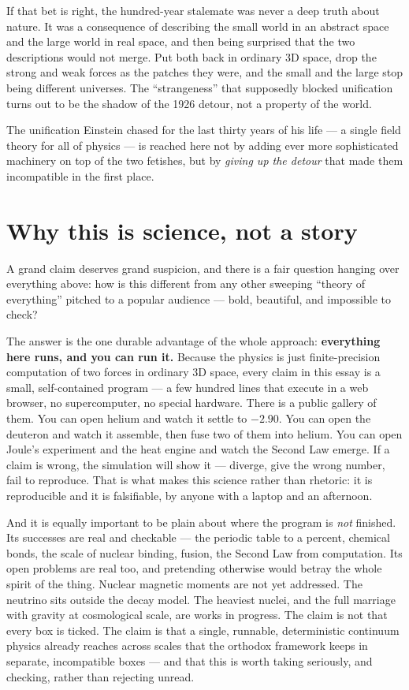\documentclass[11pt]{article}
\begin{document}
If that bet is right, the hundred-year stalemate was never a deep truth about nature. It was a
consequence of describing the small world in an abstract space and the large world in real space,
and then being surprised that the two descriptions would not merge. Put both back in ordinary 3D
space, drop the strong and weak forces as the patches they were, and the small and the large stop
being different universes. The ``strangeness'' that supposedly blocked unification turns out to be
the shadow of the 1926 detour, not a property of the world.

The unification Einstein chased for the last thirty years of his life --- a single field theory for
all of physics --- is reached here not by adding ever more sophisticated machinery on top of the
two fetishes, but by \emph{giving up the detour} that made them incompatible in the first place.

\section*{Why this is science, not a story}

A grand claim deserves grand suspicion, and there is a fair question hanging over everything above:
how is this different from any other sweeping ``theory of everything'' pitched to a popular audience
--- bold, beautiful, and impossible to check?

The answer is the one durable advantage of the whole approach: \textbf{everything here runs, and
you can run it.} Because the physics is just finite-precision computation of two forces in ordinary
3D space, every claim in this essay is a small, self-contained program --- a few hundred lines that
execute in a web browser, no supercomputer, no special hardware. There is a public gallery of them.
You can open helium and watch it settle to $-2.90$. You can open the deuteron and watch it assemble,
then fuse two of them into helium. You can open Joule's experiment and the heat engine and watch
the Second Law emerge. If a claim is wrong, the simulation will show it --- diverge, give the wrong
number, fail to reproduce. That is what makes this science rather than rhetoric: it is reproducible
and it is falsifiable, by anyone with a laptop and an afternoon.

And it is equally important to be plain about where the program is \emph{not} finished. Its
successes are real and checkable --- the periodic table to a percent, chemical bonds, the scale of
nuclear binding, fusion, the Second Law from computation. Its open problems are real too, and
pretending otherwise would betray the whole spirit of the thing. Nuclear magnetic moments are not
yet addressed. The neutrino sits outside the decay model. The heaviest nuclei, and the full
marriage with gravity at cosmological scale, are works in progress. The claim is not that every box
is ticked. The claim is that a single, runnable, deterministic continuum physics already reaches
across scales that the orthodox framework keeps in separate, incompatible boxes --- and that this
is worth taking seriously, and checking, rather than rejecting unread.
\end{document}
